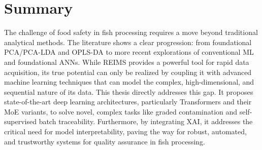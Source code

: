 \section{Summary}

The challenge of food safety in fish processing requires a move beyond traditional analytical methods. The literature shows a clear progression: from foundational PCA/PCA-LDA and OPLS-DA to more recent explorations of conventional ML and foundational ANNs. While REIMS provides a powerful tool for rapid data acquisition, its true potential can only be realized by coupling it with advanced machine learning techniques that can model the complex, high-dimensional, and sequential nature of its data. This thesis directly addresses this gap. It proposes state-of-the-art deep learning architectures, particularly Transformers and their MoE variants, to solve novel, complex tasks like graded contamination and self-supervised batch traceability. Furthermore, by integrating XAI, it addresses the critical need for model interpretability, paving the way for robust, automated, and trustworthy systems for quality assurance in fish processing.